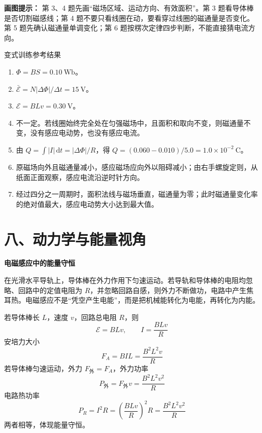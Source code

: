 \textbf{画图提示：} 第 3、4 题先画“磁场区域、运动方向、有效面积”。第 3 题看导体棒是否切割磁感线；第 4 题不要只看线圈在动，要看穿过线圈的磁通量是否变化。第 5 题先确认磁通量单调变化；第 6 题按楞次定律四步判断，不能直接猜电流方向。

\begin{learningbox}{变式训练参考结果}
\begin{enumerate}[itemsep=0.45em,topsep=0.3em,parsep=0pt]
  \item $\Phi=BS=0.10\ \mathrm{Wb}$。
  \item $\bar{\mathcal E}=N|\Delta\Phi|/\Delta t=15\ \mathrm V$。
  \item $\mathcal E=BLv=0.30\ \mathrm V$。
  \item 不一定。若线圈始终完全处在匀强磁场中，且面积和取向不变，则磁通量不变，没有感应电动势，也没有感应电流。
  \item 由 $Q=\int |I|\,\mathrm dt=|\Delta\Phi|/R$，得
  $Q=(0.060-0.010)/5.0=1.0\times10^{-2}\ \mathrm C$。
  \item 原磁场向外且磁通量减小，感应磁场应向外以阻碍减小；由右手螺旋定则，从纸面正面观察，感应电流沿逆时针方向。
  \item 经过四分之一周期时，面积法线与磁场垂直，磁通量为零；此时磁通量变化率的绝对值最大，感应电动势大小达到最大值。
\end{enumerate}
\end{learningbox}

\section*{八、动力学与能量视角}

\begin{competitionbox}
\textbf{电磁感应中的能量守恒}

在光滑水平导轨上，导体棒在外力作用下匀速运动。若导轨和导体棒的电阻均忽略、回路中的定值电阻为 $R$，并忽略回路自感，则外力不断做功，电路中产生焦耳热。电磁感应不是“凭空产生电能”，而是把机械能转化为电能，再转化为内能。

\begin{center}


\label{fig:induction-energy-flow}
\end{center}

若导体棒长 $L$，速度 $v$，回路总电阻 $R$，则
\[
\mathcal E=BLv,\qquad I=\frac{BLv}{R}
\]
安培力大小
\[
F_A=BIL=\frac{B^2L^2v}{R}
\]
若导体棒匀速运动，外力 $F_{\text{外}}=F_A$，外力功率
\[
P_{\text{外}}=F_{\text{外}}v=\frac{B^2L^2v^2}{R}
\]
电路热功率
\[
P_R=I^2R=\left(\frac{BLv}{R}\right)^2R=\frac{B^2L^2v^2}{R}
\]
两者相等，体现能量守恒。
\end{competitionbox}

